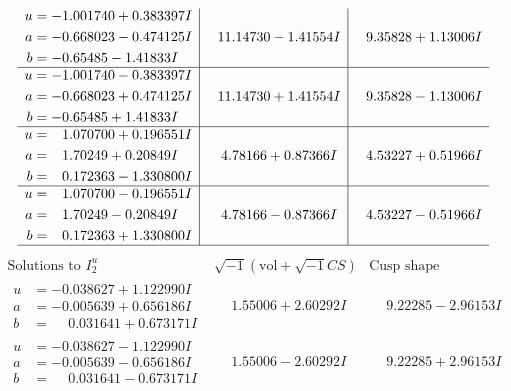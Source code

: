 \documentclass[1p]{elsarticle_modified}
\theoremstyle{definition}
\newcommand{\I}{\sqrt{-1}}
\begin{document}
$$\begin{array}{c|c|c}
\begin{aligned}
u &= -1.001740 + 0.383397 I \\
a &= -0.668023 - 0.474125 I \\
b &= -0.65485 - 1.41833 I\end{aligned}
 & \phantom{-}11.14730 - 1.41554 I & \phantom{-}9.35828 + 1.13006 I \\ \hline\begin{aligned}
u &= -1.001740 - 0.383397 I \\
a &= -0.668023 + 0.474125 I \\
b &= -0.65485 + 1.41833 I\end{aligned}
 & \phantom{-}11.14730 + 1.41554 I & \phantom{-}9.35828 - 1.13006 I \\ \hline\begin{aligned}
u &= \phantom{-}1.070700 + 0.196551 I \\
a &= \phantom{-}1.70249 + 0.20849 I \\
b &= \phantom{-}0.172363 - 1.330800 I\end{aligned}
 & \phantom{-}4.78166 + 0.87366 I & \phantom{-}4.53227 + 0.51966 I \\ \hline\begin{aligned}
u &= \phantom{-}1.070700 - 0.196551 I \\
a &= \phantom{-}1.70249 - 0.20849 I \\
b &= \phantom{-}0.172363 + 1.330800 I\end{aligned}
 & \phantom{-}4.78166 - 0.87366 I & \phantom{-}4.53227 - 0.51966 I\\
 \hline 
 \end{array}$$\newpage$$\begin{array}{c|c|c}  
\text{Solutions to }I^u_{2}& \I (\text{vol} + \sqrt{-1}CS) & \text{Cusp shape}\\
 \hline 
\begin{aligned}
u &= -0.038627 + 1.122990 I \\
a &= -0.005639 + 0.656186 I \\
b &= \phantom{-}0.031641 + 0.673171 I\end{aligned}
 & \phantom{-}1.55006 + 2.60292 I & \phantom{-}9.22285 - 2.96153 I \\ \hline\begin{aligned}
u &= -0.038627 - 1.122990 I \\
a &= -0.005639 - 0.656186 I \\
b &= \phantom{-}0.031641 - 0.673171 I\end{aligned}
 & \phantom{-}1.55006 - 2.60292 I & \phantom{-}9.22285 + 2.96153 I \\ \hline\begin{aligned}

\end{aligned}
\end{array}$$
\end{document}
